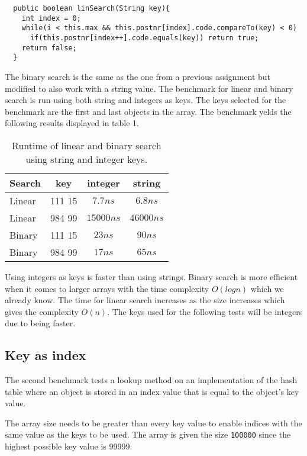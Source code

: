 \documentclass[a4paper,11pt]{article}
\begin{document}
\begin{verbatim}
  public boolean linSearch(String key){
    int index = 0;
    while(i < this.max && this.postnr[index].code.compareTo(key) < 0)
      if(this.postnr[index++].code.equals(key)) return true;
    return false;
  }
\end{verbatim}

The binary search is the same as the one from a previous assignment 
but modified to also work with a string value. The benchmark for linear 
and binary search is run using both string and integers as keys. The
keys selected for the benchmark are the first and last objects in the 
array. The benchmark yelds the following results displayed in table 1.

\begin{table}[h]
  \begin{center}
  \begin{tabular}{l|c|c|c}
  \textbf{Search} & \textbf{key} & \textbf{integer} & \textbf{string} \\
  \hline
    Linear  & 111 15  & $ 7.7 ns$   & $ 6.8 ns$   \\
    Linear  & 984 99  & $ 15000 ns$ & $ 46000 ns$ \\
    Binary  & 111 15  & $ 23 ns$    & $ 90 ns$    \\
    Binary  & 984 99  & $ 17 ns$    & $ 65 ns$    \\
  \end{tabular}
  \caption{Runtime of linear and binary search using string and integer keys.}
  \label{tab:table1}
  \end{center}
\end{table}

Using integers as keys is faster than using strings. Binary search is
more efficient when it comes to larger arrays with the time complexity 
$ O(logn)$ which we already know. The time for linear search increases 
as the size increases which gives the complexity $ O(n)$. The keys 
used for the following tests will be integers due to being faster.

\subsection*{Key as index}

The second benchmark tests a lookup method on an implementation of the 
hash table where an object is stored in an index value that is equal 
to the object's key value.

The array size needs to be greater than every key value to enable indices 
with the same value as the keys to be used. The array is given the size 
{\tt 100000} since the highest possible key value is 99999. 
\end{document}
